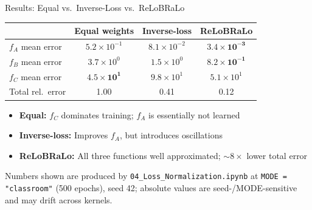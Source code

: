 \documentclass[aspectratio=169,11pt]{beamer}
\newcommand{\emphc}[1]{\textcolor{harvardcrimson}{#1}}
\begin{document}
\begin{frame}{Results: Equal vs.\ Inverse-Loss vs.\ ReLoBRaLo}
\begin{center}
\renewcommand{\arraystretch}{1.3}
{\small
\begin{tabular}{@{}lccc@{}}
\toprule
 & \textbf{Equal weights} & \textbf{Inverse-loss} & \textbf{ReLoBRaLo} \\
\midrule
$f_A$ mean error & $5.2 \times 10^{-1}$ & $8.1 \times 10^{-2}$ & $\bm{3.4 \times 10^{-3}}$ \\
$f_B$ mean error & $3.7 \times 10^{0}$ & $1.5 \times 10^{0}$ & $\bm{8.2 \times 10^{-1}}$ \\
$f_C$ mean error & $\bm{4.5 \times 10^{1}}$ & $9.8 \times 10^{1}$ & $5.1 \times 10^{1}$ \\
\midrule
Total rel.\ error & 1.00 & 0.41 & \emphc{0.12} \\
\bottomrule
\end{tabular}
}
\end{center}

\vspace{0.3cm}
\begin{itemize}
    \item \textbf{Equal:} $f_C$ dominates training; $f_A$ is essentially \emphc{not learned}
    \item \textbf{Inverse-loss:} Improves $f_A$, but introduces oscillations
    \item \textbf{ReLoBRaLo:} All three functions well approximated; $\sim 8\times$ lower total error
\end{itemize}

\vspace{0.2cm}
{\scriptsize Numbers shown are produced by \texttt{04\_Loss\_Normalization.ipynb} at \texttt{MODE = "classroom"} (500 epochs), seed 42; absolute values are seed-/MODE-sensitive and may drift across kernels.}
\end{frame}
\end{document}
